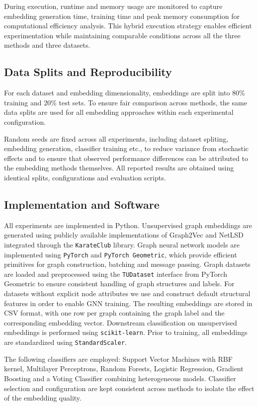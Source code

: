 During execution, runtime and memory usage are monitored to capture embedding generation time, training time
and peak memory consumption for computational efficiency analysis.
This hybrid execution strategy enables efficient experimentation while maintaining comparable conditions across all the three
methods and three datasets. 


\subsection{Data Splits and Reproducibility}
For each dataset and embedding dimensionality, embeddings are split into 80\% training and 20\% test sets.
To ensure fair comparison across methods, the same data splits are used for all embedding approaches
within each experimental configuration.

Random seeds are fixed across all experiments, including dataset spliting, embedding generation, classifier training etc.,  
to reduce variance from stochastic effects 
and to ensure that observed performance differences can be attributed to the embedding methods themselves.
All reported results are obtained using identical splits, configurations and evaluation scripts. 



\subsection{Implementation and Software}
All experiments are implemented in Python.
Unsupervised graph embeddings are generated using publicly available implementations of Graph2Vec
and NetLSD integrated through the \texttt{KarateClub} library. 
Graph neural network models are implemented using \texttt{PyTorch} and \texttt{PyTorch Geometric}, 
which provide efficient primitives for graph construction, batching and message passing.
Graph datasets are loaded and preprocessed using the \texttt{TUDataset} interface from PyTorch Geometric 
to ensure consistent handling of graph structures and labels.
For datasets without explicit node attributes we use and construct default structural features 
in order to enable GNN training.
The resulting embeddings are stored in CSV format, with one row per graph containing
the graph label and the corresponding embedding vector. Downstream classification on unsupervised embeddings is performed using \texttt{scikit-learn}.
Prior to training, all embeddings are standardized using \texttt{StandardScaler}.

The following classifiers are employed: Support Vector Machines with RBF kernel, Multilayer Perceptrons,
Random Forests, Logistic Regression, Gradient Boosting and a  Voting Classifier combining heterogeneous
models. 
Classifier selection and configuration are kept consistent across methods to isolate the effect of the embedding quality.


